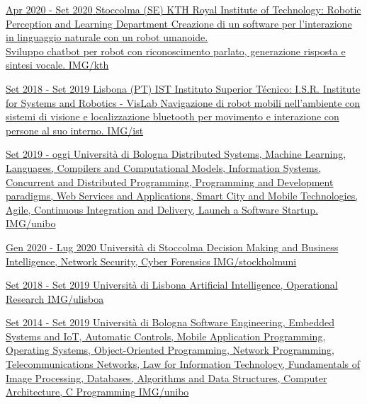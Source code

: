 \documentclass[paper=a4,fontsize=11pt, hidelinks]{temp} %
\begin{document}
\href{https://www.kth.se/is/rpl}{
{Apr 2020 - Set 2020}
{Stoccolma (SE) KTH Royal Institute of Technology: Robotic Perception and Learning Department}
{
Creazione di un software per l'interazione in linguaggio naturale con un robot umanoide.\\ Sviluppo chatbot per robot con riconoscimento parlato, generazione risposta e sintesi vocale.
} {IMG/kth}
}
\sepspace

\href{https://welcome.isr.tecnico.ulisboa.pt/}{
{Set 2018 - Set 2019 }
{Lisbona (PT) IST Instituto Superior Técnico: I.S.R. Institute for Systems and Robotics - VisLab}
{
Navigazione di robot mobili nell'ambiente con sistemi di visione e localizzazione bluetooth per movimento e interazione con persone al suo interno.
} {IMG/ist}
}
\noindent

\href{https://corsi.unibo.it/2cycle/ComputerScienceEngineering}{
{Set 2019 - oggi}
{Università di Bologna}
{Distributed Systems, Machine Learning,    Languages, Compilers and Computational Models,    Information Systems,     Concurrent and Distributed Programming,    Programming and Development paradigms,    Web Services and Applications,     Smart City and Mobile Technologies,     Agile, Continuous Integration and Delivery, Launch a Software Startup.  } 
{IMG/unibo}
}
\sepspace

\href{https://dsv.su.se/en/}{
{Gen 2020 - Lug 2020}
{Università di Stoccolma}
{Decision Making and Business Intelligence, Network Security, Cyber Forensics}
{IMG/stockholmuni}
}
\sepspace

\href{https://ciencias.ulisboa.pt/en}{
{Set 2018 - Set 2019}
{Università di Lisbona}
{Artificial Intelligence, Operational Research} 
{IMG/ulisboa}
}
\sepspace

\href{https://corsi.unibo.it/1cycle/ComputerScienceEngineering}{
{Set 2014 - Set 2019}
{Università di Bologna}
{Software Engineering, Embedded Systems and IoT, Automatic Controls, Mobile Application Programming, Operating Systems, Object-Oriented Programming, Network Programming, Telecommunications Networks, Law for Information Technology, Fundamentals of Image Processing, Databases, Algorithms and Data Structures, Computer Architecture, C Programming}
{IMG/unibo}
}
\end{document}
